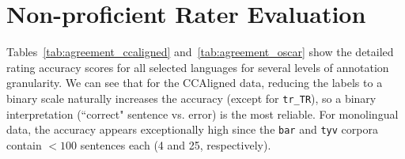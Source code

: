 \section{Non-proficient Rater Evaluation}\label{app:agreement}

Tables~\ref{tab:agreement_ccaligned} and~\ref{tab:agreement_oscar} show the detailed rating accuracy scores for all selected languages for several levels of annotation granularity. We can see that for the CCAligned data, reducing the labels to a binary scale naturally increases the accuracy (except for \texttt{tr\_TR}), so a binary interpretation (``correct" sentence vs. error) is the most reliable. For monolingual data, the accuracy appears exceptionally high since the \texttt{bar} and \texttt{tyv} corpora contain $<100$ sentences each (4 and 25, respectively).


